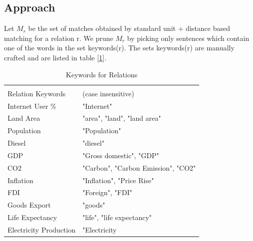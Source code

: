 \documentclass[a4paper,10pt]{article}
\begin{document}
\subsection{Approach}
Let $M_r$ be the set of matches obtained by standard unit + distance based matching for a relation r.
We prune $M_r$ by picking only sentences which contain one of the words in the set keywords(r).
The sets keywords(r) are manually crafted and are listed in table [\ref{fig:kw}].

\begin{center}
\begin{table}
 \begin{tabular}{|l|l|}
\hline \\
 Relation Keywords & (case insensitive)\\
\hline
 Internet User \% &"Internet"\\
Land Area &"area", "land", "land area"\\
Population &"Population"\\
Diesel &"diesel"\\
GDP &"Gross domestic", "GDP"\\
CO2 &"Carbon", "Carbon Emission", "CO2"\\
Inflation &"Inflation", "Price Rise"\\
FDI &"Foreign", "FDI"\\
Goods Export & "goods"\\
Life Expectancy & "life", "life expectancy"\\
Electricity Production & "Electricity\\
\hline
\end{tabular}
\caption{Keywords for Relations}
\label{fig:kw}
\end{table}
 \end{center}
\end{document}
